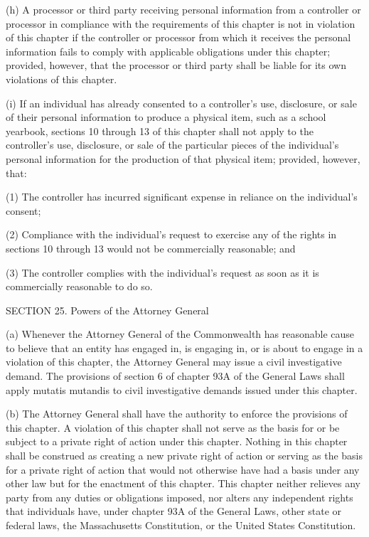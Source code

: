 (h) A processor or third party receiving personal information from a controller or processor in compliance with the requirements of this chapter is not in violation of this chapter if the controller or processor from which it receives the personal information fails to comply with applicable obligations under this chapter; provided, however, that the processor or third party shall be liable for its own violations of this chapter.

(i) If an individual has already consented to a controller’s use, disclosure, or sale of their personal information to produce a physical item, such as a school yearbook, sections 10 through 13 of this chapter shall not apply to the controller’s use, disclosure, or sale of the particular pieces of the individual’s personal information for the production of that physical item; provided, however, that: 

(1) The controller has incurred significant expense in reliance on the individual’s consent;

(2) Compliance with the individual’s request to exercise any of the rights in sections 10 through 13 would not be commercially reasonable; and 

(3) The controller complies with the individual’s request as soon as it is commercially reasonable to do so.

SECTION 25. Powers of the Attorney General

(a) Whenever the Attorney General of the Commonwealth has reasonable cause to believe that an entity has engaged in, is engaging in, or is about to engage in a violation of this chapter, the Attorney General may issue a civil investigative demand. The provisions of section 6 of chapter 93A of the General Laws shall apply mutatis mutandis to civil investigative demands issued under this chapter.

(b) The Attorney General shall have the authority to enforce the provisions of this chapter. A violation of this chapter shall not serve as the basis for or be subject to a private right of action under this chapter. Nothing in this chapter shall be construed as creating a new private right of action or serving as the basis for a private right of action that would not otherwise have had a basis under any other law but for the enactment of this chapter. This chapter neither relieves any party from any duties or obligations imposed, nor alters any independent rights that individuals have, under chapter 93A of the General Laws, other state or federal laws, the Massachusetts Constitution, or the United States Constitution.

